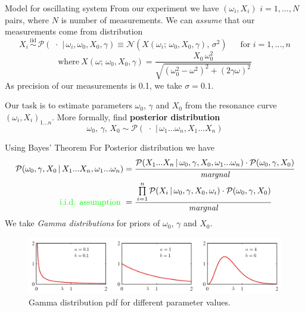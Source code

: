 \begin{frame}{Model for oscillating system}
From our experiment we have $(\omega_i, X_i)$ $i=1,...,N$ pairs, where $N$ is number of measurements. We can \textit{assume} that our measurements come from distribution
  \begin{equation*}\label{eq:distribution}
  X_i \, \overset{\text{iid}}{\sim} \,  
  \mathcal{P}(\,\, \cdot \,\, | \, \omega_i, \omega_0, X_0, \gamma) \equiv \mathcal{N}(X(\omega_i; \, \omega_0, X_0, \gamma),\,\sigma^{2})\ \quad 
  \text{   for   } i=1,...,n
  \end{equation*}
  \begin{equation*}\label{eq:solution-amplitude-new}
  \text{where} \ X(\omega; \, \omega_0, X_0, \gamma) = \frac{X_0 \, \omega_0^2} {\sqrt{(\omega_0^2-\omega^2)^2+(2 \gamma \omega)^2}}
  \end{equation*}
  \pause
  As precision of our measurements is 0.1, we take $\sigma = 0.1$.
  
  Our task is to estimate parameters $\omega_0,\, \gamma$ and $X_0$ from the resonance curve $(\omega_i, X_i)_{1...n}$. More formally, find \textbf{posterior distribution}
  \begin{equation}\label{eq:inference1}
  \omega_0, \, \gamma, \, X_0 \sim \mathcal{P}(\,\, \cdot \,\, | \, \omega_1...\omega_n, X_1...X_n)
  \end{equation}
\end{frame}

\begin{frame}{Using Bayes' Theorem}
For Posterior distribution we have
\begin{align*}
  \begin{split}
  \mathcal{P}(\omega_0, \gamma,X_0\,|\,X_1...X_n, \omega_1...\omega_n) &=
  \cfrac{\mathcal{P}(X_1...X_n\,|\,\omega_0,\gamma,X_0,\omega_1...\omega_n) \cdot
  	\mathcal{P}(\omega_0,\gamma,X_0)
  }{\textit{margnal}} \\
\textcolor{green}{\text{i.i.d. assumption} \ }&= \cfrac{\prod\limits_{i=1}^{n}\mathcal{P}(X_i\,|\,\omega_0,\gamma,X_0, \omega_i) \cdot
	\mathcal{P}(\omega_0,\gamma,X_0)
}{\textit{margnal}}
\end{split}
\end{align*}
\pause
We take \textit{Gamma distributions} for priors of $\omega_0$, $\gamma$ and $X_0$. 

\begin{figure}
	\centering
	\includegraphics[width=\linewidth]{images/gamma.jpg}
	\caption{Gamma distribution pdf for different parameter values.}
\end{figure}
\end{frame}

